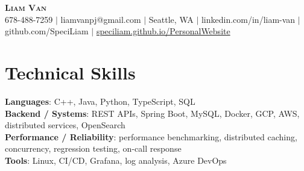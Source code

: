 \documentclass[letterpaper,11pt]{article}
\begin{document}

%
\begin{center}
    \textbf{\Huge \scshape Liam Van} \\ \vspace{1pt}
    \small 678-488-7259 $|$ \small {liamvanpj@gmail.com} $|$ Seattle, WA
 {{$|$ linkedin.com/in/liam-van} {$|$ github.com/SpeciLiam} {$|$ \href{https://speciliam.github.io/PersonalWebsite}{speciliam.github.io/PersonalWebsite}}}

\end{center}

\section{Technical Skills}
 \begin{itemize}[leftmargin=0.15in, label={}]
    \small{\item{
     \textbf{Languages}{: C++, Java, Python, TypeScript, SQL} \\
     \textbf{Backend / Systems}{: REST APIs, Spring Boot, MySQL, Docker, GCP, AWS, distributed services, OpenSearch} \\
     \textbf{Performance / Reliability}{: performance benchmarking, distributed caching, concurrency, regression testing, on-call response} \\
     \textbf{Tools}{: Linux, CI/CD, Grafana, log analysis, Azure DevOps} \\
    }}
 \end{itemize}
%

\end{document}
